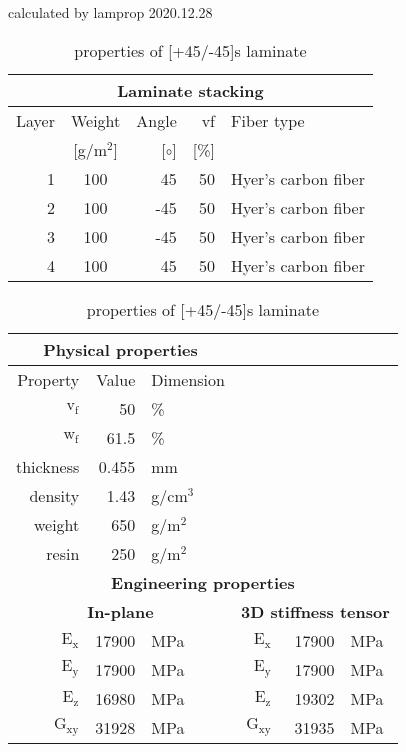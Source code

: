 \begin{table}[!htbp]
  \renewcommand{\arraystretch}{1.2}
  \caption{\label{tab:[+45/-45]s laminate}properties of [+45/-45]s laminate}
  \centering\footnotesize{\rule{0pt}{10pt}
  \tiny calculated by lamprop 2020.12.28\\[3pt]}
    \begin{tabular}[t]{rcrrl}
      \multicolumn{5}{c}{\small\textbf{Laminate stacking}}\\[0.1em]
      \toprule %
      Layer & Weight & Angle & vf & Fiber type\\
            & [g/m$^2$] & [$\circ$] & [\%]\\
      \midrule
      1 &  100 &    45 & 50 & Hyer's carbon fiber\\
      2 &  100 &   -45 & 50 & Hyer's carbon fiber\\
      3 &  100 &   -45 & 50 & Hyer's carbon fiber\\
      4 &  100 &    45 & 50 & Hyer's carbon fiber\\
      \bottomrule
    \end{tabular}\hspace{0.02\textwidth}
    \begin{tabular}[t]{rrlrrl}
      \multicolumn{3}{c}{\small\textbf{Physical properties}}\\[0.1em]
      \toprule
      Property & Value & Dimension\\
      \midrule
      $\mathrm{v_f}$ & 50 &\%\\
      $\mathrm{w_f}$ & 61.5 &\%\\
      thickness & 0.455 & mm\\
      density & 1.43 & g/cm$^3$\\
      weight & 650 & g/m$^2$\\
      resin & 250 & g/m$^2$\\
      \midrule
      \multicolumn{6}{c}{\small\textbf{Engineering properties}}\\[0.1em]
      \multicolumn{3}{c}{\small\textbf{In-plane}} & 
\multicolumn{3}{c}{\small\textbf{3D stiffness tensor}}\\[0.1em]
      $\mathrm{E_x}$ &    17900 & MPa & $\mathrm{E_x}$ &    17900 & MPa\\
      $\mathrm{E_y}$ &    17900 & MPa & $\mathrm{E_y}$ &    17900 & MPa\\
      $\mathrm{E_z}$ &    16980 & MPa & $\mathrm{E_z}$ &    19302 & MPa\\
      $\mathrm{G_{xy}}$ &    31928 & MPa & $\mathrm{G_{xy}}$ &    31935 & MPa\\

\end{tabular}
\end{table}
